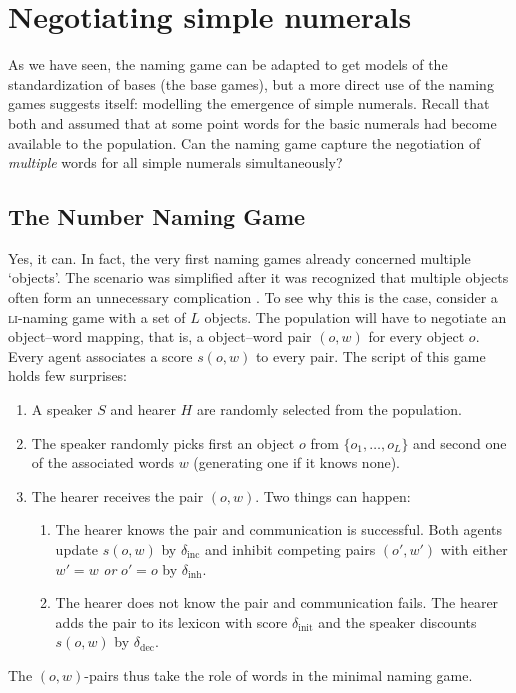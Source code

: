 \documentclass{../src/bcthesispart}
\begin{document}
\section{Negotiating simple numerals}

As we have seen, the naming game can be adapted to get models of the standardization of bases (the base games),
but a more direct use of the naming games suggests itself: modelling the emergence of simple numerals.
Recall that both \textcite{VonMengden2008} and \textcite{Hurford1987} assumed that at some point words for the basic numerals had become available to the population.
Can the naming game capture the negotiation of \emph{multiple} words for all simple numerals simultaneously?

\subsection{The Number Naming Game}
Yes, it can. 
In fact, the very first naming games already concerned multiple ‘objects’.
The scenario was simplified after it was recognized that multiple objects often form an unnecessary complication \parencite{Wellens2012}. 
To see why this is the case, consider a \textsc{li}-naming game with a set of $L$ objects.
The population will have to negotiate an object--word mapping, that is, a object--word pair $(o, w)$ for every object $o$.
Every agent associates a score $s(o,w)$ to every pair.
The script of this game holds few surprises:


\begin{enumerate}
	\item A speaker $S$ and hearer $H$ are randomly selected from the population.
	\item The speaker randomly picks first an object $o$ from $\{o_1, \dots, o_L\}$ and second one of the associated words $w$ (generating one if it knows none).
	\item The hearer receives the pair $(o, w)$. Two things can happen:
		\begin{enumerate}
			\item The hearer knows the pair and communication is successful. Both agents update $s(o,w)$ by $\delta_{\text{inc}}$ and inhibit competing pairs $(o', w')$ with either $w' = w$ \emph{or} $o' = o$ by $\delta_{\text{inh}}$.
			\item The hearer does not know the pair and communication fails. The hearer adds the pair to its lexicon with score $\delta_{\text{init}}$ and the speaker discounts $s(o,w)$ by $\delta_{\text{dec}}$.
		\end{enumerate}
\end{enumerate}
%
The $(o,w)$-pairs thus take the role of words in the minimal naming game.
\end{document}
